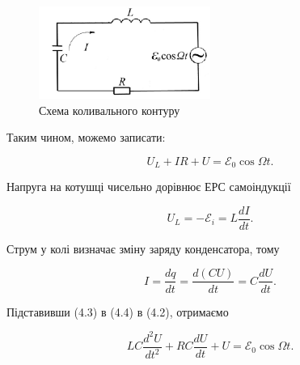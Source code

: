 \documentclass[12pt,a4paper]{article}
\begin{document}
    \begin{figure}[h!]

        \renewcommand{\thefigure}{4.\arabic{figure}} %

        \centering
        \includegraphics[width=0.5\textwidth]{4.2.png}
        \caption{Схема коливального контуру}
        \label{fig2:schema}

    \end{figure}

    Таким чином, можемо записати:

    \begin{equation}
        U_L + IR + U = \mathcal{E}_0 \cos \Omega t.
        \tag{4.2}
    \end{equation}

    Напруга на котушці чисельно дорівнює ЕРС самоіндукції

    \begin{equation}
        U_L = -\mathcal{E}_i = L \frac{dI}{dt}.
        \tag{4.3}
    \end{equation}

    Струм у колі визначає зміну заряду конденсатора, тому

    \vspace{0.5em}

    \begin{equation}
        I = \frac{dq}{dt} = \frac{d(CU)}{dt} = C \frac{dU}{dt}.
        \tag{4.4}
    \end{equation}

    \vspace{0.5em}

    Підставивши (4.3) в (4.4) в (4.2), отримаємо

    \vspace{0.5em}

    \begin{equation}
        LC \frac{d^2U}{dt^2} + RC \frac{dU}{dt} + U = \mathcal{E}_0 \cos \Omega t.
        \tag{4.5}
    \end{equation}
\end{document}
